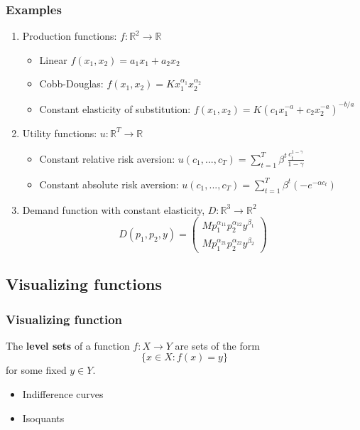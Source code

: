\documentclass[compress]{beamer}
\def\R{\mathbb{R}}
\renewcommand{\to}{{\rightarrow}}
\begin{document}
\begin{frame}
  \frametitle{Examples}
  \begin{enumerate}
  \item Production functions: $f:\R^2 \to \R$ 
    \begin{itemize}
    \item Linear $ f(x_1,x_2) = a_1 x_1 + a_2 x_2 $
    \item Cobb-Douglas: $f(x_1,x_2) = K x_1^{\alpha_1} x_2^{\alpha_2}$
    \item Constant elasticity of substitution: $f(x_1,x_2) = K (c_1
      x_1^{-a} + c_2 x_2^{-a})^{-b/a}$
    \end{itemize}
  \item Utility functions: $u: \R^T \to \R$
    \begin{itemize}
    \item Constant relative risk aversion: $u(c_1,...,c_T) =
      \sum_{t=1}^T \beta^t \frac{c_t^{1-\gamma}}{1-\gamma}$
    \item Constant absolute risk aversion: $u(c_1,...,c_T) =
      \sum_{t=1}^T \beta^t (-e^{-\alpha c_t})$
    \end{itemize}
  \item Demand function with constant elasticity,  $D:\R^3 \to \R^2$
    \[ D(p_1,p_2,y) = \begin{pmatrix} M p_1^{\alpha_{11}}
      p_2^{\alpha_{12}} y^{\beta_1} \\
      M p_1^{\alpha_{21}} p_2^{\alpha_{22}} y^{\beta_2}
    \end{pmatrix}
    \]
  \end{enumerate}
\end{frame}

\subsection{Visualizing functions}
\begin{frame}
  \frametitle{Visualizing function}
  \begin{definition}
    The \textbf{level sets} of a function $f:X\to Y$ are sets of the
    form 
    \[ \{ x \in X: f(x) = y \} \]
    for some fixed $y \in Y$.
  \end{definition}
  \begin{itemize}
  \item Indifference curves
  \item Isoquants
  \end{itemize}
\end{frame}
\end{document}
